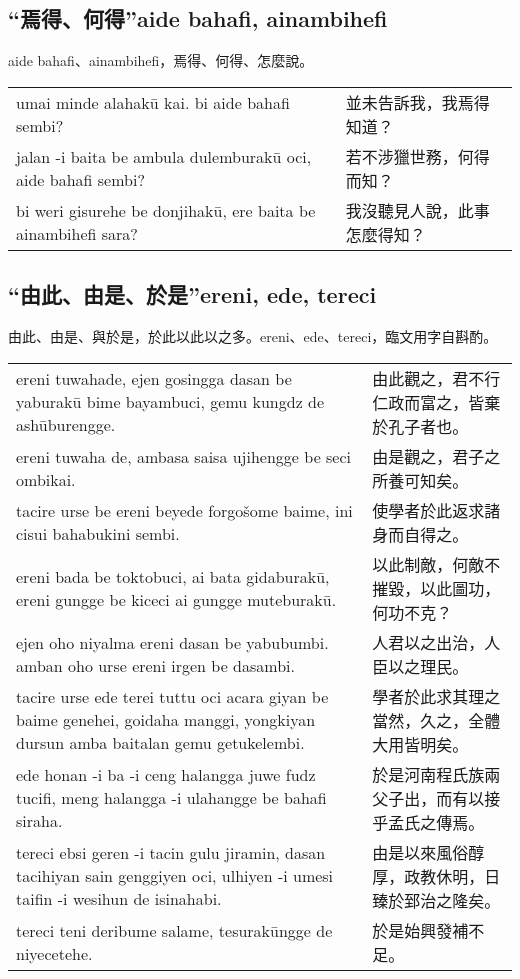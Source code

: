 \documentclass{article}
\begin{document}
\subsection{“焉得、何得”aide bahafi, ainambihefi}
\noindent aide bahafi、ainambihefi，焉得、何得、怎麼說。
\begin{center}
    \begin{tabularx}{\textwidth}{XX}
        umai minde alahak\={u} kai. bi aide bahafi sembi? & 並未告訴我，我焉得知道？\\
        jalan -i baita be ambula dulemburak\={u} oci, aide bahafi sembi? & 若不涉獵世務，何得而知？\\
        bi weri gisurehe be donjihak\={u}, ere baita be ainambihefi sara? & 我沒聽見人說，此事怎麼得知？
    \end{tabularx}
\end{center}

\subsection{“由此、由是、於是”ereni, ede, tereci}
\noindent 由此、由是、與於是，於此以此以之多。ereni、ede、tereci，臨文用字自斟酌。
\begin{center}
    \begin{tabularx}{\textwidth}{XX}
        ereni tuwahade, ejen gosingga dasan be yaburak\={u} bime bayambuci, gemu kungdz de ash\={u}burengge. & 由此觀之，君不行仁政而富之，皆棄於孔子者也。\\
        ereni tuwaha de, ambasa saisa ujihengge be seci ombikai. & 由是觀之，君子之所養可知矣。\\
        tacire urse be ereni beyede forgo\v{s}ome baime, ini cisui bahabukini sembi. & 使學者於此返求諸身而自得之。\\
        ereni bada be toktobuci, ai bata gidaburak\={u}, ereni gungge be kiceci ai gungge muteburak\={u}. & 以此制敵，何敵不摧毀，以此圖功，何功不克？\\
        ejen oho niyalma ereni dasan be yabubumbi. amban oho urse ereni irgen be dasambi. & 人君以之出治，人臣以之理民。\\
        tacire urse ede terei tuttu oci acara giyan be baime genehei, goidaha manggi, yongkiyan dursun amba baitalan gemu getukelembi. & 學者於此求其理之當然，久之，全體大用皆明矣。\\
        ede honan -i ba -i ceng halangga juwe fudz tucifi, meng halangga -i ulahangge be bahafi siraha. & 於是河南程氏族兩父子出，而有以接乎孟氏之傳焉。\\
        tereci ebsi geren -i tacin gulu jiramin, dasan tacihiyan sain genggiyen oci, ulhiyen -i umesi taifin -i wesihun de isinahabi. & 由是以來風俗醇厚，政教休明，日臻於郅治之隆矣。\\
        tereci teni deribume salame, tesurak\={u}ngge de niyecetehe. & 於是始興發補不足。
    \end{tabularx}
\end{center}
\end{document}
